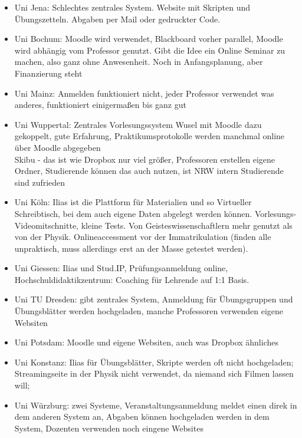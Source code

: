 \begin{itemize}
\begin{itemize}
					\item Uni Jena: Schlechtes zentrales System. Website mit Skripten und Übungszetteln.
						Abgaben per Mail oder gedruckter Code. \\
					\item Uni Bochum: Moodle wird verwendet, Blackboard vorher parallel, Moodle wird abhängig vom Professor genutzt. Gibt die Idee ein Online Seminar zu machen, also ganz ohne Anwesenheit. Noch in Anfangsplanung, aber Finanzierung steht \\
					\item Uni Mainz: Anmelden funktioniert nicht, jeder Professor verwendet was anderes, funktioniert einigermaßen bis ganz gut \\
					\item Uni Wuppertal: Zentrales Vorlesungssystem Wusel mit Moodle dazu gekoppelt,
						gute Erfahrung, Praktikumsprotokolle werden manchmal online über Moodle abgegeben \\
						Skibu - das ist wie Dropbox nur viel größer, Professoren erstellen eigene Ordner, Studierende können das auch nutzen, ist NRW intern
						Studierende sind zufrieden \\
					\item Uni Köln: Ilias ist die Plattform für Materialien und so
						Virtueller Schreibtisch, bei dem auch eigene Daten abgelegt werden können. Vorlesungs-Videomitschnitte, kleine Tests. Von Geisteswissenschaftlern mehr genutzt als von der Physik.
						Onlineaccessment vor der Immatrikulation (finden alle unpraktisch, muss allerdings erst an der Masse getestet werden). \\
					\item Uni Giessen: Ilias und Stud.IP,
						Prüfungsanmeldung online, Hochschuldidaktikzentrum: Coaching für Lehrende auf 1:1 Basis. \\
					\item Uni TU Dresden: gibt zentrales System,
						Anmeldung für Übungsgruppen und Übungsblätter werden hochgeladen,
						manche Professoren verwenden eigene Websiten \\
					\item Uni Potsdam: Moodle und eigene Websiten,
						auch was Dropbox ähnliches \\
					\item Uni Konstanz: Ilias für Übungsblätter, Skripte werden oft nicht hochgeladen; Streamingseite in der Physik nicht verwendet, da niemand sich Filmen lassen will; \\
					\item Uni Würzburg: zwei Systeme, Veranstaltungsanmeldung meldet einen direk in dem anderen System an,
						Abgaben können hochgeladen werden in dem System,
						Dozenten verwenden noch eingene Websites
				\end{itemize}


\end{itemize}
